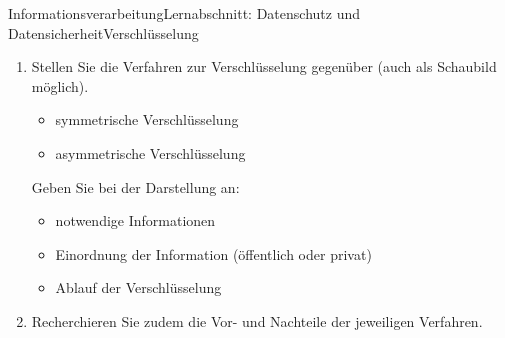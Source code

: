 \documentclass[oneside,openany,headings=optiontotoc,11pt,numbers=noenddot]{scrreprt}
\begin{document}
	\begin{worksheet}{Informationsverarbeitung}{Lernabschnitt: Datenschutz und Datensicherheit}{Verschlüsselung}
		\noindent
		\sffamily
		\begin{enumerate}
			\item Stellen Sie die Verfahren zur Verschlüsselung gegenüber (auch als Schaubild möglich).
			\begin{itemize}[label=+]
				\item symmetrische Verschlüsselung
				\item asymmetrische Verschlüsselung
			\end{itemize}
			Geben Sie bei der Darstellung an:
			\begin{itemize}[label=-]
				\item notwendige Informationen
				\item Einordnung der Information (öffentlich oder privat)
				\item Ablauf der Verschlüsselung
			\end{itemize}
			\item Recherchieren Sie zudem die Vor- und Nachteile der jeweiligen Verfahren.
		\end{enumerate}
	\end{worksheet}
\end{document}
